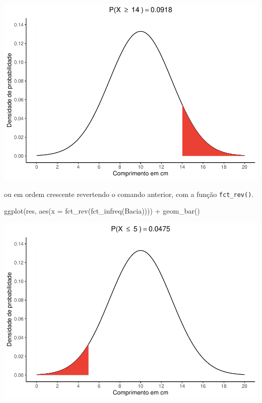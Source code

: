 \documentclass[
]{book}
\newenvironment{Shaded}{\begin{snugshade}}{\end{snugshade}}
\newcommand{\AttributeTok}[1]{\textcolor[rgb]{0.77,0.63,0.00}{#1}}
\newcommand{\FunctionTok}[1]{\textcolor[rgb]{0.00,0.00,0.00}{#1}}
\newcommand{\NormalTok}[1]{#1}
\newcommand{\SpecialCharTok}[1]{\textcolor[rgb]{0.00,0.00,0.00}{#1}}
\begin{document}
\includegraphics{probest-cambientais_files/figure-latex/unnamed-chunk-77-1.pdf}

ou em ordem crescente revertendo o comando anterior, com a função \texttt{fct\_rev()}.

\begin{Shaded}
\begin{Highlighting}[]
\FunctionTok{ggplot}\NormalTok{(res, }\FunctionTok{aes}\NormalTok{(}\AttributeTok{x =} \FunctionTok{fct\_rev}\NormalTok{(}\FunctionTok{fct\_infreq}\NormalTok{(Bacia)))) }\SpecialCharTok{+}
  \FunctionTok{geom\_bar}\NormalTok{()}
\end{Highlighting}
\end{Shaded}

\includegraphics{probest-cambientais_files/figure-latex/unnamed-chunk-78-1.pdf}
\end{document}
